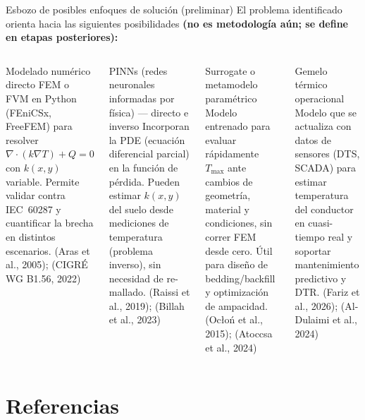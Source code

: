 \documentclass[aspectratio=169]{beamer}
\newcommand{\refcite}[1]{{\footnotesize\color{gray!70!black} #1}}
\begin{document}
\begin{frame}{Esbozo de posibles enfoques de solución (preliminar)}
\justifying\scriptsize
El problema identificado orienta hacia las siguientes posibilidades
\textbf{(no es metodología aún; se define en etapas posteriores):}

\vspace{0.15em}
\begin{columns}[T]
\begin{block}{Modelado numérico directo}
\scriptsize FEM o FVM en Python (FEniCSx, FreeFEM) para resolver
$\nabla\cdot(k\nabla T) + Q = 0$ con $k(x,y)$ variable.
Permite validar contra IEC~60287 y cuantificar la brecha en distintos
escenarios. \refcite{(Aras et al., 2005); (CIGRÉ WG B1.56, 2022)}
\end{block}
\vspace{0.15em}
\begin{block}{PINNs (redes neuronales informadas por física) --- directo e inverso}
\scriptsize Incorporan la PDE (ecuación diferencial parcial) en la función de pérdida. Pueden estimar $k(x,y)$
del suelo desde mediciones de temperatura (problema inverso), sin necesidad
de re-mallado.
\refcite{(Raissi et al., 2019); (Billah et al., 2023)}
\end{block}
\begin{block}{Surrogate o metamodelo paramétrico}
\scriptsize Modelo entrenado para evaluar rápidamente $T_{\max}$ ante cambios
de geometría, material y condiciones, sin correr FEM desde cero.
Útil para diseño de bedding/backfill y optimización de ampacidad.
\refcite{(Ocłoń et al., 2015); (Atoccsa et al., 2024)}
\end{block}
\vspace{0.15em}
\begin{block}{Gemelo térmico operacional}
\scriptsize Modelo que se actualiza con datos de sensores (DTS, SCADA) para
estimar temperatura del conductor en cuasi-tiempo real y soportar
mantenimiento predictivo y DTR.
\refcite{(Fariz et al., 2026); (Al-Dulaimi et al., 2024)}
\end{block}
\end{columns}
\end{frame}

\section{Referencias}
\end{document}
